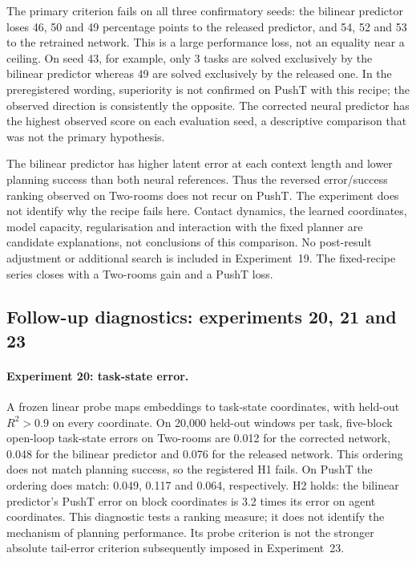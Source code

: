 \documentclass[11pt,a4paper]{article}
\begin{document}
The primary criterion fails on all three confirmatory seeds: the bilinear predictor loses 46, 50 and 49 percentage points to the released predictor, and 54, 52 and 53 to the retrained network. This is a large performance loss, not an equality near a ceiling. On seed 43, for example, only 3 tasks are solved exclusively by the bilinear predictor whereas 49 are solved exclusively by the released one. In the preregistered wording, superiority is not confirmed on PushT with this recipe; the observed direction is consistently the opposite. The corrected neural predictor has the highest observed score on each evaluation seed, a descriptive comparison that was not the primary hypothesis.

The bilinear predictor has higher latent error at each context length and lower planning success than both neural references. Thus the reversed error/success ranking observed on Two-rooms does not recur on PushT. The experiment does not identify why the recipe fails here. Contact dynamics, the learned coordinates, model capacity, regularisation and interaction with the fixed planner are candidate explanations, not conclusions of this comparison. No post-result adjustment or additional search is included in Experiment~19. The fixed-recipe series closes with a Two-rooms gain and a PushT loss.

\subsection{Follow-up diagnostics: experiments 20, 21 and 23}
\label{sec:followups}

\paragraph{Experiment 20: task-state error.} A frozen linear probe maps embeddings to task-state coordinates, with held-out $R^2>0.9$ on every coordinate. On 20,000 held-out windows per task, five-block open-loop task-state errors on Two-rooms are 0.012 for the corrected network, 0.048 for the bilinear predictor and 0.076 for the released network. This ordering does not match planning success, so the registered H1 fails. On PushT the ordering does match: 0.049, 0.117 and 0.064, respectively. H2 holds: the bilinear predictor's PushT error on block coordinates is 3.2 times its error on agent coordinates. This diagnostic tests a ranking measure; it does not identify the mechanism of planning performance. Its probe criterion is not the stronger absolute tail-error criterion subsequently imposed in Experiment~23.
\end{document}
